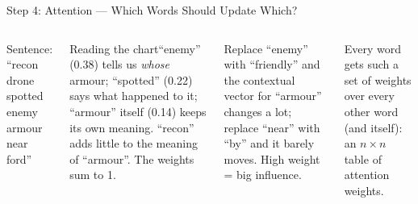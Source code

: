 \documentclass[aspectratio=169,10pt]{beamer}
\begin{document}
\begin{frame}{Step 4: Attention --- Which Words Should Update Which?}
\begin{columns}[T]
\scriptsize Sentence: ``recon drone spotted enemy armour near ford''
\begin{cbox}{Reading the chart}\scriptsize ``enemy'' (0.38) tells us \emph{whose} armour; ``spotted'' (0.22) says what happened to it; ``armour'' itself (0.14) keeps its own meaning. ``recon'' adds little to the meaning of ``armour''. The weights sum to 1.\end{cbox}
\begin{rbox}\scriptsize Replace ``enemy'' with ``friendly'' and the contextual vector for ``armour'' changes a lot; replace ``near'' with ``by'' and it barely moves. High weight = big influence.\end{rbox}
\begin{ibox}\scriptsize Every word gets such a set of weights over every other word (and itself): an $n\times n$ table of attention weights.\end{ibox}
\end{columns}
\end{frame}
\end{document}

